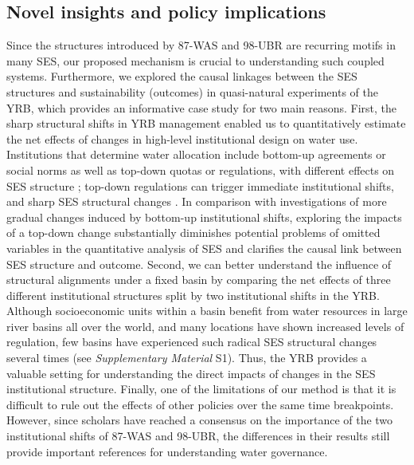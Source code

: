 
\subsection{Novel insights and policy implications}
\label{insights}

Since the structures introduced by 87-WAS and 98-UBR are recurring motifs in many SES, our proposed mechanism is crucial to understanding such coupled systems.
Furthermore, we explored the causal linkages between the SES structures and sustainability (outcomes) in quasi-natural experiments of the YRB, which provides an informative case study for two main reasons.
First, the sharp structural shifts in YRB management enabled us to quantitatively estimate the net effects of changes in high-level institutional design on water use. Institutions that determine water allocation include bottom-up agreements or social norms as well as top-down quotas or regulations, with different effects on SES structure \cite{wang2019d,speed2013}; top-down regulations can trigger immediate institutional shifts, and sharp SES structural changes \cite{speed2013,roland2004}.
In comparison with investigations of more gradual changes induced by bottom-up institutional shifts, exploring the impacts of a top-down change substantially diminishes potential problems of omitted variables in the quantitative analysis of SES and clarifies the causal link between SES structure and outcome.
Second, we can better understand the influence of structural alignments under a fixed basin by comparing the net effects of three different institutional structures split by two institutional shifts in the YRB. Although socioeconomic units within a basin benefit from water resources in large river basins all over the world, and many locations have shown increased levels of regulation, few basins have experienced such radical SES structural changes several times (see \textit{Supplementary Material} S1). Thus, the YRB provides a valuable setting for understanding the direct impacts of changes in the SES institutional structure.
Finally, one of the limitations of our method is that it is difficult to rule out the effects of other policies over the same time breakpoints.
However, since scholars have reached a consensus on the importance of the two institutional shifts of 87-WAS and 98-UBR, the differences in their results still provide important references for understanding water governance.

